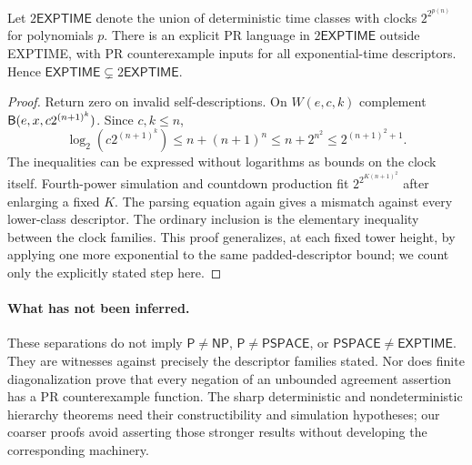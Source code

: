 \begin{theorem}\label{thm:H05}
Let $2\mathsf{EXPTIME}$ denote the union of deterministic time classes with clocks $2^{2^{p(n)}}$ for polynomials $p$. There is an explicit PR language in $2\mathsf{EXPTIME}$ outside EXPTIME, with PR counterexample inputs for all exponential-time descriptors. Hence $\mathsf{EXPTIME}\subsetneq2\mathsf{EXPTIME}$.
\end{theorem}
\begin{proof}
Return zero on invalid self-descriptions. On $W(e,c,k)$ complement $\mathsf B(e,x,c2^{(n+1)^k})$. Since $c,k\le n$,
\[
 \log_2(c2^{(n+1)^k})
 \le n+(n+1)^n\le n+2^{n^2}\le2^{(n+1)^2+1}.
\]
The inequalities can be expressed without logarithms as bounds on the clock itself. Fourth-power simulation and countdown production fit $2^{2^{K(n+1)^2}}$ after enlarging a fixed $K$. The parsing equation again gives a mismatch against every lower-class descriptor. The ordinary inclusion is the elementary inequality between the clock families. This proof generalizes, at each fixed tower height, by applying one more exponential to the same padded-descriptor bound; we count only the explicitly stated step here.
\end{proof}

\paragraph{What has not been inferred.}
These separations do not imply $\mathsf P\ne\mathsf{NP}$, $\mathsf P\ne\mathsf{PSPACE}$, or $\mathsf{PSPACE}\ne\mathsf{EXPTIME}$. They are witnesses against precisely the descriptor families stated. Nor does finite diagonalization prove that every negation of an unbounded agreement assertion has a PR counterexample function. The sharp deterministic and nondeterministic hierarchy theorems need their constructibility and simulation hypotheses; our coarser proofs avoid asserting those stronger results without developing the corresponding machinery.
